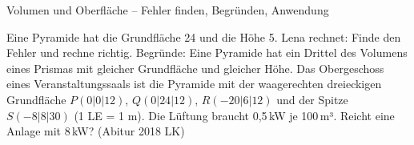 \begin{aufgabe}{Volumen und Oberfläche – Fehler finden, Begründen, Anwendung}
\begin{teile}
\teil Eine Pyramide hat die Grundfläche 24 und die Höhe 5. Lena rechnet:  Finde den Fehler und rechne richtig.
\teil Begründe: Eine Pyramide hat ein Drittel des Volumens eines Prismas mit gleicher Grundfläche und gleicher Höhe.
\teil Das Obergeschoss eines Veranstaltungssaals ist die Pyramide mit der waagerechten dreieckigen Grundfläche $P(0 | 0 | 12)$, $Q(0 | 24 | 12)$, $R(-20 | 6 | 12)$ und der Spitze $S(-8 | 8 | 30)$ (1 LE = 1 m). Die Lüftung braucht 0{,}5\,kW je 100\,m³. Reicht eine Anlage mit 8\,kW? \hfill (Abitur 2018 LK)
\end{teile}
\end{aufgabe}
